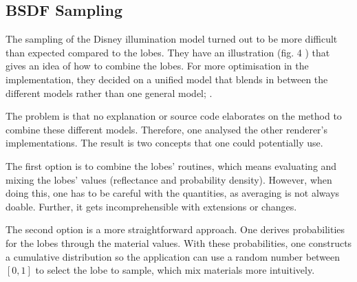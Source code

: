 \subsection*{BSDF Sampling}

The sampling of the Disney illumination model turned out to be more difficult than expected compared to the lobes.
They have an illustration (fig. 4 \cite{burley_extending_2015}) that gives an idea of how to combine the lobes.
For more optimisation in the implementation, they decided on a unified model that blends in between the different models rather than one general model; \cite{burley_extending_2015}.

The problem is that no explanation or source code elaborates on the method to combine these different models.
Therefore, one analysed the other renderer's implementations.
The result is two concepts that one could potentially use.

The first option is to combine the lobes' routines, which means evaluating and mixing the lobes' values (reflectance and probability density).
However, when doing this, one has to be careful with the quantities, as averaging is not always doable.
Further, it gets incomprehensible with extensions or changes.

The second option is a more straightforward approach.
One derives probabilities for the lobes through the material values.
With these probabilities, one constructs a cumulative distribution so the application can use a random number between $[0,1]$ to select the lobe to sample, which mix materials more intuitively.

